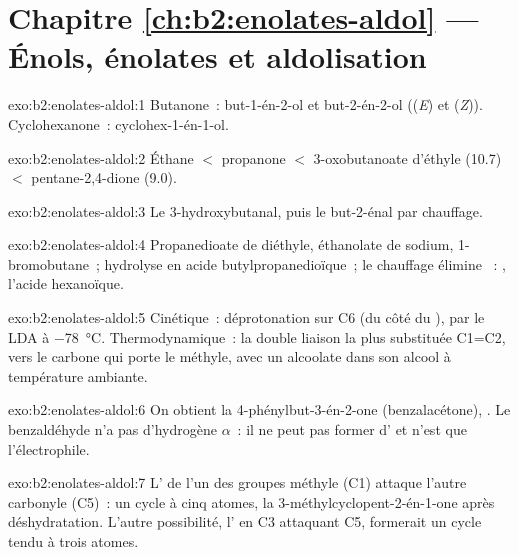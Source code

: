 \section*{Chapitre \ref{ch:b2:enolates-aldol} --- Énols, énolates et aldolisation}

\begin{solution}{exo:b2:enolates-aldol:1}
Butanone~: but-1-én-2-ol  et but-2-én-2-ol  ((\textit{E}) et
(\textit{Z})). Cyclohexanone~: cyclohex-1-én-1-ol.
\end{solution}

\begin{solution}{exo:b2:enolates-aldol:2}
Éthane $<$ propanone $<$ 3-oxobutanoate d'éthyle (10.7) $<$ pentane-2,4-dione (9.0).
\end{solution}

\begin{solution}{exo:b2:enolates-aldol:3}
Le 3-hydroxybutanal, puis le but-2-énal par chauffage.
\end{solution}

\begin{solution}{exo:b2:enolates-aldol:4}
Propanedioate de diéthyle, éthanolate de sodium, 1-bromobutane~; hydrolyse en acide butylpropanedioïque~;
le chauffage élimine ~: , l'acide hexanoïque.
\end{solution}

\begin{solution}{exo:b2:enolates-aldol:5}
Cinétique~: déprotonation sur C6 (du côté du ), par le LDA à \qty{-78}{\degreeCelsius}. Thermodynamique~:
la double liaison la plus substituée C1=C2, vers le carbone qui porte le méthyle, avec un alcoolate dans
son alcool à température ambiante.
\end{solution}

\begin{solution}{exo:b2:enolates-aldol:6}
On obtient la 4-phénylbut-3-én-2-one (benzalacétone), . Le benzaldéhyde n'a pas d'hydrogène $\alpha$~:
il ne peut pas former d' et n'est que l'électrophile.
\end{solution}

\begin{solution}{exo:b2:enolates-aldol:7}
L' de l'un des groupes méthyle (C1) attaque l'autre carbonyle (C5)~: un cycle à cinq atomes,
la 3-méthylcyclopent-2-én-1-one après déshydratation. L'autre possibilité, l' en C3 attaquant C5,
formerait un cycle tendu à trois atomes.
\end{solution}

